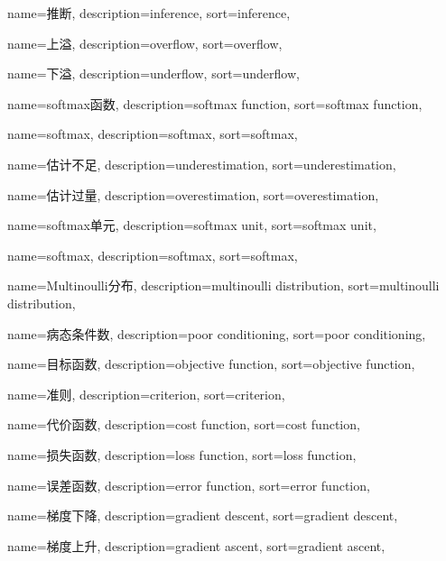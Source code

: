 {
  name=推断,
  description={inference},
  sort={inference},
}

{
  name=上溢,
  description={overflow},
  sort={overflow},
}

{
  name=下溢,
  description={underflow},
  sort={underflow},
}

{
  name=softmax函数,
  description={softmax function},
  sort={softmax function},
}

{
  name=softmax,
  description={softmax},
  sort={softmax},
}

{
  name=估计不足,
  description={underestimation},
  sort={underestimation},
}

{
  name=估计过量,
  description={overestimation},
  sort={overestimation},
}

{
  name=softmax单元,
  description={softmax unit},
  sort={softmax unit},
}

{
  name=softmax,
  description={softmax},
  sort={softmax},
}

{
  name=Multinoulli分布,
  description={multinoulli distribution},
  sort={multinoulli distribution},
}

{
  name=病态条件数,
  description={poor conditioning},
  sort={poor conditioning},
}

{
  name=目标函数,
  description={objective function},
  sort={objective function},
}

{
  name=准则,
  description={criterion},
  sort={criterion},
}

{
  name=代价函数,
  description={cost function},
  sort={cost function},
}

{
  name=损失函数,
  description={loss function},
  sort={loss function},
}

{
  name=误差函数,
  description={error function},
  sort={error function},
}

{
  name=梯度下降,
  description={gradient descent},
  sort={gradient descent},
}

{
  name=梯度上升,
  description={gradient ascent},
  sort={gradient ascent},
}

